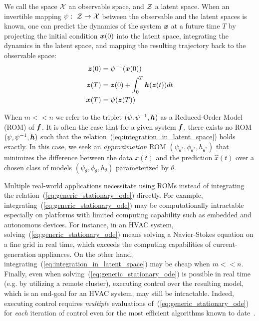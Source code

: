 We call the space $\operatorname{\mathcal{X}}$ an observable space, and $\operatorname{\mathcal{Z}}$ a latent space. When an invertible mapping $\psi:\ \operatorname{\mathcal{Z}} \to \operatorname{\mathcal{X}}$ between the observable and the latent spaces is known, one can predict the dynamics of the system $\boldsymbol{x}$ at a future time $T$ by projecting the initial condition $\boldsymbol{x}(0)$ into the latent space, integrating the dynamics in the latent space, and mapping the resulting trajectory back to the observable space:
\begin{equation}
\label{eq:integration_in_latent_space}
\begin{split}
    \boldsymbol{z}(0) & = \psi^{-1}(\boldsymbol{x}(0)) \\
    \boldsymbol{z}(T) & = \boldsymbol{z}(0) + \int_{0}^T\boldsymbol{h}(\boldsymbol{z}(t))dt \\
    \boldsymbol{x}(T) & = \psi(\boldsymbol{z}(T))
\end{split}
\end{equation}

When $m << n$ we refer to the triplet $(\psi, \psi^{-1}, \boldsymbol{h})$ as a Reduced-Order Model (ROM) of $\boldsymbol{f}$. It is often the case that for a given system $\boldsymbol{f}$, there exists no ROM $(\psi, \psi^{-1}, \boldsymbol{h})$ such that the relation~(\ref{eq:integration_in_latent_space}) holds exactly. In this case, we seek an \textit{approximation} ROM $(\psi_{\theta^*}, \phi_{\theta^*}, h_{\theta^*})$ that minimizes the difference between the data $x(t)$ and the prediction $\hat{x}(t)$ over a chosen class of models $(\psi_\theta, \phi_\theta, h_\theta)$ parameterized by $\theta$.

Multiple real-world applications necessitate using ROMs instead of integrating the relation~(\ref{eq:generic_stationary_ode}) directly. For example, integrating~(\ref{eq:generic_stationary_ode}) may be computationally intractable especially on platforms with limited computing capability such as embedded and autonomous devices. For instance, in an HVAC system, solving~(\ref{eq:generic_stationary_ode}) means solving a Navier-Stokes equation on a fine grid in real time, which exceeds the computing capabilities of current-generation appliances. On the other hand, integrating~(\ref{eq:integration_in_latent_space}) may be cheap when $m << n$. Finally, even when solving~(\ref{eq:generic_stationary_ode}) is possible in real time (e.g. by utilizing a remote cluster), executing control over the resulting model, which is an end-goal for an HVAC system, may still be intractable. Indeed, executing control requires \textit{multiple} evaluations of~(\ref{eq:generic_stationary_ode}) for \textit{each} iteration of control even for the most efficient algorithms known to date~\cite{duriez2017machine}. 

